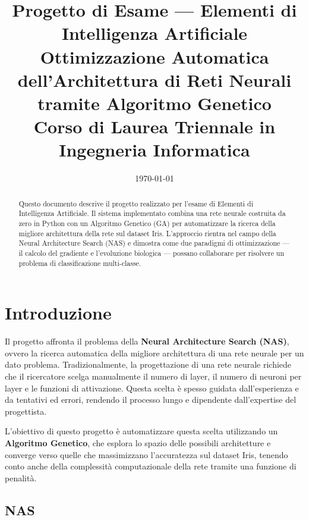 \documentclass[12pt, a4paper]{article}
\title{
    \vspace{-1cm}
    {\Large Progetto di Esame — Elementi di Intelligenza Artificiale}\\[0.8cm]
    {\huge \textbf{Ottimizzazione Automatica}}\\[0.3cm]
    {\huge \textbf{dell'Architettura di Reti Neurali}}\\[0.3cm]
    {\huge \textbf{tramite Algoritmo Genetico}}\\[1cm]
    {\large Corso di Laurea Triennale in Ingegneria Informatica}
}
\author{}
\date{\today}
\begin{document}

\maketitle
\thispagestyle{empty}
\vspace{1cm}

\begin{abstract}
Questo documento descrive il progetto realizzato per l'esame di Elementi di
Intelligenza Artificiale. Il sistema implementato combina una rete neurale
costruita da zero in Python con un Algoritmo Genetico (GA) per automatizzare
la ricerca della migliore architettura della rete sul dataset Iris.
L'approccio rientra nel campo della Neural Architecture Search (NAS) e
dimostra come due paradigmi di ottimizzazione --- il calcolo del gradiente e
l'evoluzione biologica --- possano collaborare per risolvere un problema di
classificazione multi-classe.
\end{abstract}

\newpage
\tableofcontents
\newpage

\section{Introduzione}

Il progetto affronta il problema della \textbf{Neural Architecture Search (NAS)},
ovvero la ricerca automatica della migliore architettura di una rete neurale
per un dato problema. Tradizionalmente, la progettazione di una rete neurale
richiede che il ricercatore scelga manualmente il numero di layer, il numero
di neuroni per layer e le funzioni di attivazione. Questa scelta è spesso
guidata dall'esperienza e da tentativi ed errori, rendendo il processo lungo
e dipendente dall'expertise del progettista.

L'obiettivo di questo progetto è automatizzare questa scelta utilizzando un
\textbf{Algoritmo Genetico}, che esplora lo spazio delle possibili architetture e
converge verso quelle che massimizzano l'accuratezza sul dataset Iris, tenendo
conto anche della complessità computazionale della rete tramite una funzione
di penalità.

\subsection{NAS}
\end{document}
